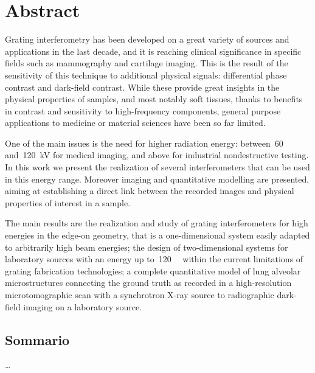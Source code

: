 \begingroup
\let\clearpage\relax
\let\cleardoublepage\relax
\let\cleardoublepage\relax

\chapter*{Abstract}
Grating interferometry has been developed on a great variety of sources and
applications in the last decade, and it is reaching clinical significance in
specific fields such as mammography and cartilage imaging. This is the
result of the sensitivity of this technique to additional physical signals:
differential phase contrast and dark-field contrast. While these provide
great insights in the physical properties of samples, and most notably soft
tissues, thanks to benefits in contrast and sensitivity to high-frequency
components, general purpose applications to medicine or material sciences
have been so far limited.

One of the main issues is the need for higher radiation energy:
between~\num{60} and~\SI{120}{\kilo\volt} for medical imaging, and above for
industrial nondestructive testing. In this work we present the realization
of several interferometers that can be used in this energy range. Moreover
imaging and quantitative modelling are presented, aiming at establishing a
direct link between the recorded images and physical properties of interest
in a sample.

The main results are the realization and study of grating interferometers for
high energies in the edge-on geometry, that is a one-dimensional system
easily adapted to arbitrarily high beam energies; the design of
two-dimensional systems for laboratory sources with an energy up
to~\SI{120}{\kilo\voltpeak} within the current limitations of grating
fabrication technologies; a complete quantitative model of lung alveolar
microstructures connecting the ground truth as recorded in a high-resolution
microtomographic scan with a synchrotron X-ray source to radiographic
dark-field imaging on a laboratory source.

\newpage

\begin{otherlanguage}{italian}
\chapter*{Sommario}
\dots
\end{otherlanguage}

\endgroup

\vfill
